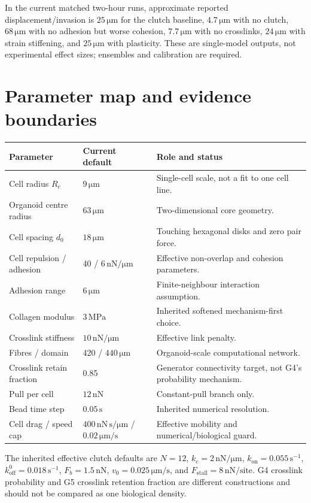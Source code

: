 \documentclass[10.5pt]{article}
\newcommand{\unit}[1]{\,\mathrm{#1}}
\begin{document}
In the current matched two-hour runs, approximate reported displacement/invasion is
$25\unit{\mu m}$ for the clutch baseline, $4.7\unit{\mu m}$ with no clutch,
$68\unit{\mu m}$ with no adhesion but worse cohesion, $7.7\unit{\mu m}$ with no crosslinks,
$24\unit{\mu m}$ with strain stiffening, and $25\unit{\mu m}$ with plasticity. These are
single-model outputs, not experimental effect sizes; ensembles and calibration are required.

\section{Parameter map and evidence boundaries}

\begin{longtable}{>{\raggedright\arraybackslash}p{}p{}p{}}
\toprule
Parameter & Current default & Role and status \\
\midrule
Cell radius $R_c$ & $9\unit{\mu m}$ & Single-cell scale, not a fit to one cell line. \\
Organoid centre radius & $63\unit{\mu m}$ & Two-dimensional core geometry. \\
Cell spacing $d_0$ & $18\unit{\mu m}$ & Touching hexagonal disks and zero pair force. \\
Cell repulsion / adhesion & 40 / $6\unit{nN/\mu m}$ & Effective non-overlap and cohesion parameters. \\
Adhesion range & $6\unit{\mu m}$ & Finite-neighbour interaction assumption. \\
Collagen modulus & $3\unit{MPa}$ & Inherited softened mechanism-first choice. \\
Crosslink stiffness & $10\unit{nN/\mu m}$ & Effective link penalty. \\
Fibres / domain & 420 / $440\unit{\mu m}$ & Organoid-scale computational network. \\
Crosslink retain fraction & 0.85 & Generator connectivity target, not G4's probability mechanism. \\
Pull per cell & $12\unit{nN}$ & Constant-pull branch only. \\
Bead time step & $0.05\unit{s}$ & Inherited numerical resolution. \\
Cell drag / speed cap & $400\unit{nN\,s/\mu m}$ / $0.02\unit{\mu m/s}$ & Effective mobility and numerical/biological guard. \\
\bottomrule
\end{longtable}

The inherited effective clutch defaults are $N=12$, $k_c=2\unit{nN/\mu m}$,
$k_{\mathrm{on}}=0.055\unit{s^{-1}}$, $k_{\mathrm{off}}^0=0.018\unit{s^{-1}}$,
$F_b=1.5\unit{nN}$, $v_0=0.025\unit{\mu m/s}$, and
$F_{\mathrm{stall}}=8\unit{nN/site}$. G4 crosslink probability and G5 crosslink retention
fraction are different constructions and should not be compared as one biological density.
\end{document}
